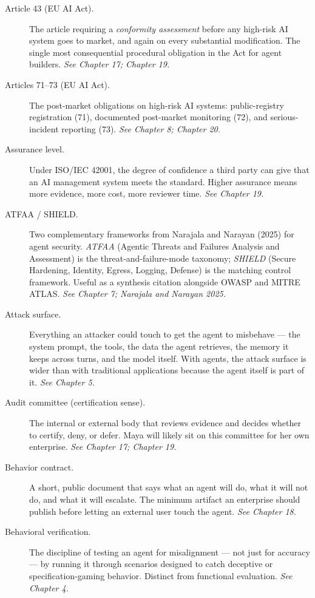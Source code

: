\begin{description}
  \item[Article 43 (EU AI Act).] The article requiring a \textit{conformity assessment} before any high-risk AI system goes to market, and again on every substantial modification. The single most consequential procedural obligation in the Act for agent builders. \textit{See Chapter 17; Chapter 19.}
  \item[Articles 71–73 (EU AI Act).] The post-market obligations on high-risk AI systems: public-registry registration (71), documented post-market monitoring (72), and serious-incident reporting (73). \textit{See Chapter 8; Chapter 20.}
  \item[Assurance level.] Under ISO/IEC 42001, the degree of confidence a third party can give that an AI management system meets the standard. Higher assurance means more evidence, more cost, more reviewer time. \textit{See Chapter 19.}
  \item[ATFAA / SHIELD.] Two complementary frameworks from Narajala and Narayan (2025) for agent security. \textit{ATFAA} (Agentic Threats and Failures Analysis and Assessment) is the threat-and-failure-mode taxonomy; \textit{SHIELD} (Secure Hardening, Identity, Egress, Logging, Defense) is the matching control framework. Useful as a synthesis citation alongside OWASP and MITRE ATLAS. \textit{See Chapter 7; Narajala and Narayan 2025.}
  \item[Attack surface.] Everything an attacker could touch to get the agent to misbehave — the system prompt, the tools, the data the agent retrieves, the memory it keeps across turns, and the model itself. With agents, the attack surface is wider than with traditional applications because the agent itself is part of it. \textit{See Chapter 5.}
  \item[Audit committee (certification sense).] The internal or external body that reviews evidence and decides whether to certify, deny, or defer. Maya will likely sit on this committee for her own enterprise. \textit{See Chapter 17; Chapter 19.}
  \item[Behavior contract.] A short, public document that says what an agent will do, what it will not do, and what it will escalate. The minimum artifact an enterprise should publish before letting an external user touch the agent. \textit{See Chapter 18.}
  \item[Behavioral verification.] The discipline of testing an agent for misalignment — not just for accuracy — by running it through scenarios designed to catch deceptive or specification-gaming behavior. Distinct from functional evaluation. \textit{See Chapter 4.}

\end{description}
